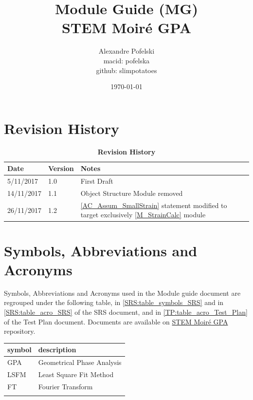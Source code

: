 \documentclass[12pt, titlepage]{article}
\newcommand{\progname}{STEM Moir{\'e} GPA}
\begin{document}
\title{Module Guide (MG) \\
STEM Moir{\'e} GPA} 
\author{Alexandre Pofelski \\
		macid: pofelska \\
		github: slimpotatoes}
\date{\today}

\maketitle


\section{Revision History}

\begin{table}[h]
\caption{\bf Revision History}
\begin{tabularx}{\textwidth}{p{3cm}p{2cm}X}
\toprule {\bf Date} & {\bf Version} & {\bf Notes}\\
\midrule
5/11/2017 & 1.0 & First Draft\\
14/11/2017 & 1.1 & Object Structure Module removed \\
26/11/2017 & 1.2 & \cref{AC_Assum_SmallStrain} statement modified to target exclusively \cref{M_StrainCalc} module\\
\bottomrule
\end{tabularx}
\end{table}

\newpage
\section{Symbols, Abbreviations and Acronyms}
\label{symbols}

Symbols, Abbreviations and Acronyms used in the Module guide document are regrouped under the following table, in \cref{SRS:table_symbols_SRS} and in \cref{SRS:table_acro_SRS} of the SRS document, and in \cref{TP:table_acro_Test_Plan} of the Test Plan document. Documents are available on \href{https://github.com/slimpotatoes/STEM_Moire_GPA}{\progname{}} repository. \par\bigskip

\renewcommand{\arraystretch}{1.2}
\begin{tabular}{l l} 
  \toprule		
  \textbf{symbol} & \textbf{description}\\
  \midrule 
  GPA & Geometrical Phase Analysis \\
  LSFM & Least Square Fit Method \\
  FT & Fourier Transform \\
  \bottomrule
  \label{table_acro_Test_Plan}
\end{tabular}
\end{document}
